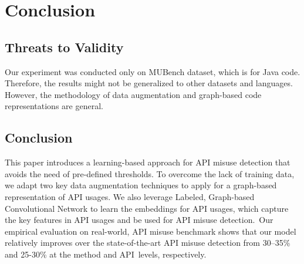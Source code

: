 \section{Conclusion}
\label{sec: conclusion}

\subsection{Threats to Validity}

Our experiment was conducted only on MUBench dataset, which is for
Java code. Therefore, the results might not be generalized to other
datasets and languages. However, the methodology of data augmentation
and graph-based code representations are general.

\subsection{Conclusion}


This paper introduces a learning-based approach for API misuse
detection that avoids the need of pre-defined thresholds. To overcome
the lack of training data, we adapt two key data augmentation
techniques to apply for a graph-based representation of API usages. We
also leverage Labeled, Graph-based Convolutional Network to learn the
embeddings for API usages, which capture the key features in API
usages and be used for API misuse detection.~Our empirical evaluation
on real-world, API misuse benchmark shows that our model relatively
improves over the state-of-the-art API misuse detection from 30--35\%
and 25-30\% at the method and API~levels, respectively.
